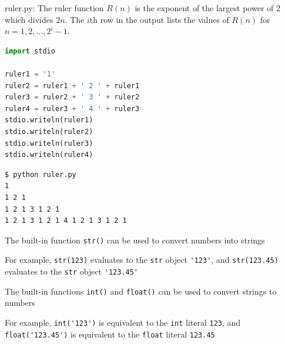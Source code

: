 \documentclass[8pt,a4paper,compress]{beamer}
\begin{document}
\begin{frame}[fragile]
\pause

\begin{framed}
\tiny ruler.py: The ruler function $R(n)$ is the exponent of the largest power of 2 which 
divides $2n$. The $i$th row in the output lists the values of $R(n)$ for $n=1,2,
\dots,2^i-1$.
\end{framed}

\begin{lstlisting}[language=Python]
import stdio

ruler1 = '1'
ruler2 = ruler1 + ' 2 ' + ruler1
ruler3 = ruler2 + ' 3 ' + ruler2
ruler4 = ruler3 + ' 4 ' + ruler3
stdio.writeln(ruler1)
stdio.writeln(ruler2)
stdio.writeln(ruler3)
stdio.writeln(ruler4)
\end{lstlisting}

\pause

\begin{lstlisting}[language={}]
$ python ruler.py 
1
1 2 1
1 2 1 3 1 2 1
1 2 1 3 1 2 1 4 1 2 1 3 1 2 1
\end{lstlisting}
\end{frame}

\begin{frame}[fragile]
\pause

The built-in function \lstinline{str()} can be used to convert numbers into strings

\pause
\bigskip

For example, \lstinline{str(123)} evaluates to the \lstinline{str} object \lstinline{'123'}, and \lstinline{str(123.45)} evaluates to the \lstinline{str} object \lstinline{'123.45'}

\pause
\bigskip

The built-in functions \lstinline{int()} and \lstinline{float()} can be used to convert strings to numbers

\pause
\bigskip

For example, \lstinline{int('123')} is equivalent to the \lstinline{int} literal \lstinline{123}, and \lstinline{float('123.45')} is equivalent to the \lstinline{float} literal \lstinline{123.45}
\end{frame}
\end{document}
